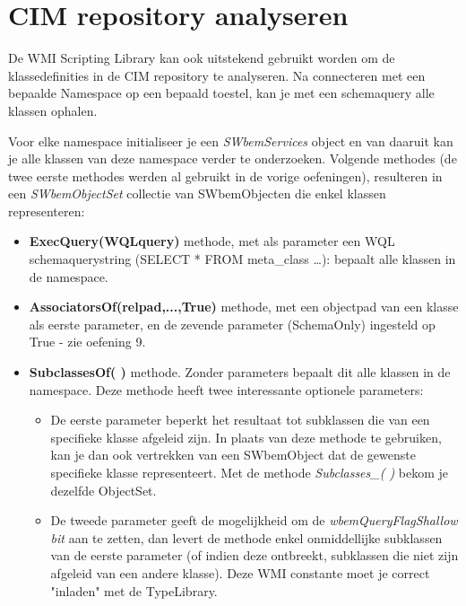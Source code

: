 \documentclass[11pt,a4paper]{report}
\begin{document}
\section{CIM repository analyseren}
De WMI Scripting Library kan ook uitstekend gebruikt worden om de klassedefinities in de CIM repository te analyseren. Na connecteren met een bepaalde Namespace op een bepaald toestel, kan je met een schemaquery alle klassen ophalen.
\par Voor elke namespace initialiseer je een \textit{SWbemServices} object en van daaruit kan je alle klassen van deze namespace verder te onderzoeken. Volgende methodes (de twee eerste methodes werden al gebruikt in de vorige oefeningen), resulteren in een \textit{SWbemObjectSet} collectie van SWbemObjecten die enkel klassen representeren:
\begin{itemize}
	\item \textbf{ExecQuery(WQLquery)} methode, met als parameter een WQL schemaquerystring (SELECT * FROM meta\_class …): bepaalt alle klassen in de namespace.
	\item \textbf{AssociatorsOf(relpad,...,True)} methode, met een objectpad van een klasse als eerste parameter, en de zevende parameter (SchemaOnly) ingesteld op True - zie oefening 9.
	\item \textbf{SubclassesOf( )} methode. Zonder parameters bepaalt dit alle klassen in de namespace.
	Deze methode heeft twee interessante optionele parameters:
	\begin{itemize}
		\item De eerste parameter beperkt het resultaat tot subklassen die van een specifieke klasse afgeleid zijn.
		In plaats van deze methode te gebruiken, kan je dan ook vertrekken van een SWbemObject dat de gewenste specifieke klasse representeert. Met de methode \textit{Subclasses\_( )} bekom je dezelfde ObjectSet.
		\item De tweede parameter geeft de mogelijkheid om de \textit{wbemQueryFlagShallow bit} aan te zetten, dan levert de methode enkel onmiddellijke subklassen van de eerste parameter (of indien deze ontbreekt, subklassen die niet zijn afgeleid van een andere klasse). Deze WMI constante moet je correct "inladen" met de TypeLibrary.
	\end{itemize}
\end{itemize}
\end{document}
